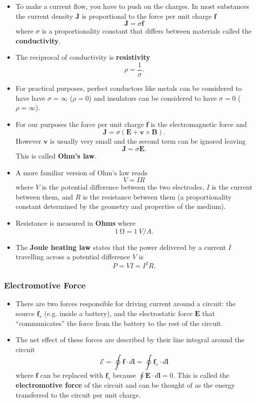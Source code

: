 \documentclass{article}
\renewcommand{\vec}[1]{\boldsymbol{\mathbf{#1}}}
\begin{document}
\begin{itemize}
  \item To make a current flow, you have to push on the charges. In most substances the current density $\vec{J}$ is proportional to the force per unit charge $\vec{f}$ \[\vec{J} = \sigma \vec{f}\] where $\sigma$ is a proportionality constant that differs between materials called the \textbf{conductivity}.

  \item The reciprocal of conductivity is \textbf{resistivity} \[\rho = \frac{1}{\sigma}.\]

  \item For practical purposes, perfect conductors like metals can be considered to have have $\sigma = \infty$ ($\rho = 0$) and insulators can be considered to have $\sigma = 0$ ($\rho = \infty$).

  \item For our purposes the force per unit charge $\vec{f}$ is the electromagnetic force and \[\vec{J} = \sigma (\vec{E} + \vec{v} \times \vec{B}).\] However $\vec{v}$ is usually very small and the second term can be ignored leaving \[\vec{J} = \sigma \vec{E}.\] This is called \textbf{Ohm's law}.

  \item A more familiar version of Ohm's law reads \[V = I R\] where $V$ is the potential difference between the two electrodes, $I$ is the current between them, and $R$ is the resistance between them (a proportionality constant determined by the geometry and properties of the medium).

  \item Resistance is measured in \textbf{Ohms} where \[\qty{1}{\ohm} = \qty{1}{V/A}.\]

  \item The \textbf{Joule heating law} states that the power delivered by a current $I$ travelling across a potential difference $V$ is \[P = V I = I^2 R.\]
\end{itemize}

\subsubsection{Electromotive Force}

\begin{itemize}
  \item There are two forces responsible for driving current around a circuit: the source $\vec{f}_s$ (e.g. inside a battery), and the electrostatic force $\vec{E}$ that ``communicates'' the force from the battery to the rest of the circuit.

  \item The net effect of these forces are described by their line integral around the circuit \[\mathcal{E} = \oint \vec{f} \cdot d \vec{l} = \oint \vec{f}_s \cdot d \vec{l}\] where $\vec{f}$ can be replaced with $\vec{f}_s$ because $\oint \vec{E} \cdot d \vec{l} = 0$. This is called the \textbf{electromotive force} of the circuit and can be thought of as the energy transferred to the circuit per unit charge.
\end{itemize}
\end{document}
